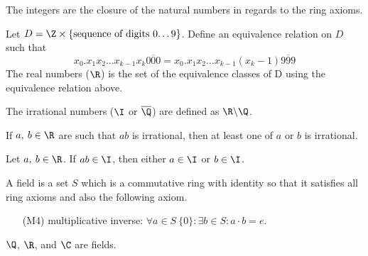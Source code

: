 \documentclass{article}
\begin{document}
\begin{note}
    The integers are the closure of the natural numbers in regards to the ring axioms.
\end{note}
%
\begin{definition}
    Let \(D = \Z \times \{\text{sequence of digits 0\ldots 9}\}\).
    Define an equivalence relation on \(D\) such that
    \begin{equation*}
        x_0 . x_1 x_2 \dots x_{k-1} x_k \overline{000} = x_0 . x_1 x_2 \dots x_{k-1} \left(x_k - 1\right)\overline{999}
    \end{equation*}
    The real numbers (\(\R\)) is the set of the equivalence classes of D using the equivalence relation above.
\end{definition}
%
\begin{definition}
    The irrational numbers (\(\I\) or \(\overline{\Q}\)) are defined as \(\R\backslash\Q\).
\end{definition}
\begin{theorem}
    If \(a,\:b\in\R\) are such that \(ab\) is irrational, then at least one of \(a\) or \(b\) is irrational.
\end{theorem}
%
\begin{note}
    Let \(a,\: b\in \R\). If \(ab\in\I\), then either \(a\in\I\) or \(b\in\I\).
\end{note}
%
\begin{tcolorboxlarge}[title={Field Axioms}]
    \begin{definition}[Field]
        A field is a set \(S\) which is a commutative ring with identity so that it satisfies all ring axioms and also the following axiom.
    \end{definition}
    \begin{enumerate}
        \item[(M4)] multiplicative inverse: \(\forall a \in S \ \{0\}:\exists b \in S: a\cdot b=e\).
    \end{enumerate}
\end{tcolorboxlarge}
\begin{note}
    \(\Q\), \(\R\), and \(\C\) are fields.
\end{note}
%
\end{document}
